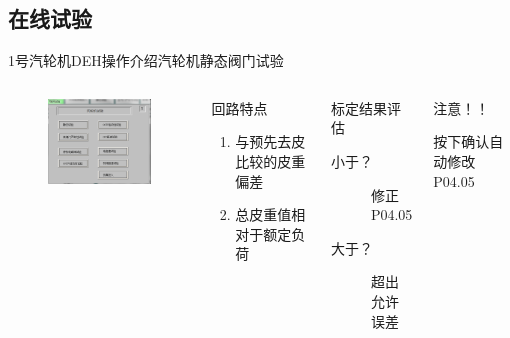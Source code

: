 \documentclass[12pt,hyperref={CJKbookmarks=true}]{beamer} %
\begin{document}
\subsection{在线试验}
\begin{frame}{1号汽轮机DEH操作介绍}{汽轮机静态阀门试验}
  		\begin{columns}
\begin{figure}
\includegraphics[angle=0,width=150pt,trim=0 0 0 0,clip]{pic/shiyan.png}
	
\end{figure}
\begin{block}{回路特点}
			\begin{enumerate}
				\item  与预先去皮比较的皮重偏差
				\item  总皮重值相对于额定负荷
				\end{enumerate}
\end{block}
\begin{exampleblock}{标定结果评估}
			\begin{description}
				\item[小于？]修正P04.05
				\item[大于？]超出允许误差
				\end{description}
\end{exampleblock}
\begin{alertblock}{注意！！}
			
				按下确认自动修改P04.05
\end{alertblock}
		\end{columns}
\end{frame}
\end{document}
